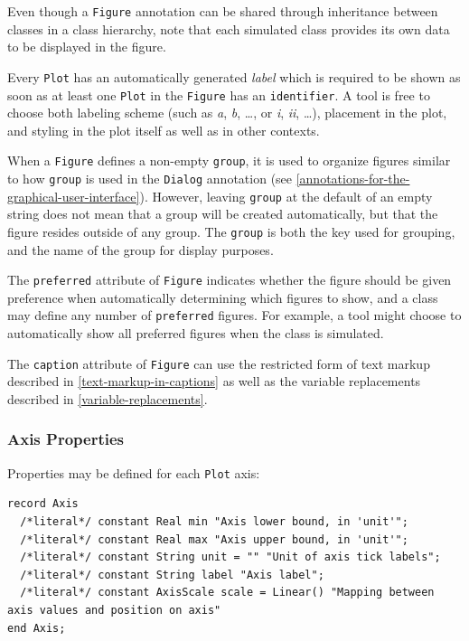 Even though a \lstinline!Figure! annotation can be shared through inheritance between classes in a class hierarchy, note that each simulated class provides its own data to be displayed in the figure.

Every \lstinline!Plot! has an automatically generated \emph{label} which is required to be shown as soon as at least one \lstinline!Plot! in the \lstinline!Figure! has an \lstinline!identifier!.
A tool is free to choose both labeling scheme (such as \emph{a}, \emph{b}, \dots, or \emph{i}, \emph{ii}, \dots), placement in the plot, and styling in the plot itself as well as in other contexts.

When a \lstinline!Figure! defines a non-empty \lstinline!group!, it is used to organize figures similar to how \lstinline!group! is used in the \lstinline!Dialog! annotation (see \cref{annotations-for-the-graphical-user-interface}).
However, leaving \lstinline!group! at the default of an empty string does not mean that a group will be created automatically, but that the figure resides outside of any group.
The \lstinline!group! is both the key used for grouping, and the name of the group for display purposes.

The \lstinline!preferred! attribute of \lstinline!Figure! indicates whether the figure should be given preference when automatically determining which figures to show, and a class may define any number of \lstinline!preferred! figures.
For example, a tool might choose to automatically show all preferred figures when the class is simulated.

The \lstinline!caption! attribute of \lstinline!Figure! can use the restricted form of text markup described in \cref{text-markup-in-captions} as well as the variable replacements described in \cref{variable-replacements}.

\subsubsection{Axis Properties}\label{axis-properties}

Properties may be defined for each \lstinline!Plot! axis:
\begin{lstlisting}[language=modelica]
record Axis
  /*literal*/ constant Real min "Axis lower bound, in 'unit'";
  /*literal*/ constant Real max "Axis upper bound, in 'unit'";
  /*literal*/ constant String unit = "" "Unit of axis tick labels";
  /*literal*/ constant String label "Axis label";
  /*literal*/ constant AxisScale scale = Linear() "Mapping between axis values and position on axis"
end Axis;
\end{lstlisting}

